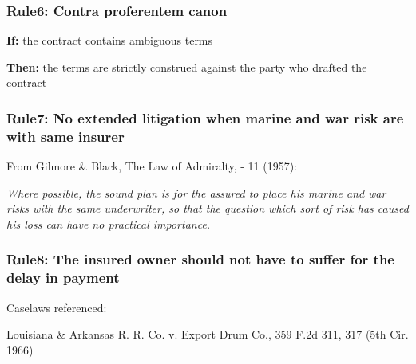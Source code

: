 \subsubsection{Rule6: Contra proferentem canon}

    \textbf{If: } the contract contains ambiguous terms
    
    \textbf{Then:} the terms are strictly construed against the party who drafted the contract




\subsubsection{Rule7: No extended litigation when marine and war risk are with same insurer}

From Gilmore \& Black, The Law of Admiralty, - 11 (1957):

\textit{Where possible, the sound plan is for the assured to place his marine and war risks
with the same underwriter, so that the question which sort of risk has caused his
loss can have no practical importance.}

\subsubsection{Rule8: The insured owner should not have to suffer for the delay in payment}

Caselaws referenced: 

Louisiana \& Arkansas R. R. Co. v. Export Drum Co., 359 F.2d 311, 317 (5th Cir. 1966)

